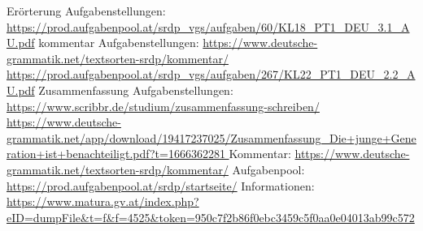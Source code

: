Erörterung Aufgabenstellungen: \href{https://prod.aufgabenpool.at/srdp\_vgs/aufgaben/60/KL18\_PT1\_DEU\_3.1\_AU.pdf}{https://prod.aufgabenpool.at/srdp\_vgs/aufgaben/60/KL18\_PT1\_DEU\_3.1\_AU.pdf}  
kommentar Aufgabenstellungen:  \href{https://www.deutsche-grammatik.net/textsorten-srdp/kommentar/ }{https://www.deutsche-grammatik.net/textsorten-srdp/kommentar/ }
\href{https://prod.aufgabenpool.at/srdp\_vgs/aufgaben/267/KL22\_PT1\_DEU\_2.2\_AU.pdf}{https://prod.aufgabenpool.at/srdp\_vgs/aufgaben/267/KL22\_PT1\_DEU\_2.2\_AU.pdf}
Zusammenfassung Aufgabenstellungen: \href{https://www.scribbr.de/studium/zusammenfassung-schreiben/}{https://www.scribbr.de/studium/zusammenfassung-schreiben/}
\href{https://www.deutsche-grammatik.net/app/download/19417237025/Zusammenfassung\_Die+junge+Generation+ist+benachteiligt.pdf?t=1666362281 }{https://www.deutsche-grammatik.net/app/download/19417237025/Zusammenfassung\_Die+junge+Generation+ist+benachteiligt.pdf?t=1666362281 }
Kommentar: \href{ https://www.deutsche-grammatik.net/textsorten-srdp/kommentar/}{ https://www.deutsche-grammatik.net/textsorten-srdp/kommentar/}
Aufgabenpool: \href{https://prod.aufgabenpool.at/srdp/startseite/}{https://prod.aufgabenpool.at/srdp/startseite/}
Informationen: \href{https://www.matura.gv.at/index.php?eID=dumpFile\&t=f\&f=4525\&token=950c7f2b86f0ebc3459c5f0aa0e04013ab99c572}{https://www.matura.gv.at/index.php?eID=dumpFile\&t=f\&f=4525\&token=950c7f2b86f0ebc3459c5f0aa0e04013ab99c572}